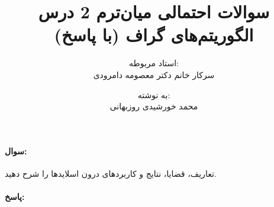 \documentclass[a4paper,10pt]{article}
\title{سوالات احتمالی میان‌ترم 2 درس الگوریتم‌های گراف (با پاسخ)}
\author{استاد مربوطه:\\سرکار خانم دکتر معصومه دامرودی \and به نوشته:\\محمد خورشیدی روزبهانی}
\date{}
\begin{document}
    \maketitle

    \paragraph{سوال:} تعاریف، قضایا، نتایج و کاربردهای درون اسلایدها را شرح دهید.

    \paragraph{پاسخ:} 
\end{document}
